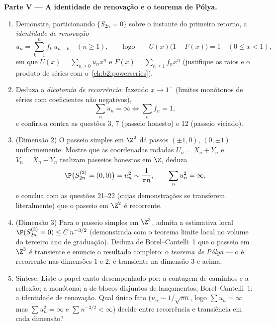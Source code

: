 \begin{problem}
\medskip
\noindent\textbf{Parte V --- A identidade de renovação e
o teorema de Pólya.}
\begin{enumerate}[resume]
  \item Demonstre, particionando $\{S_{2n} = 0\}$ sobre o instante
        do primeiro retorno, a \emph{identidade de renovação}
        \[
        u_n = \sum_{k=1}^n f_k\,u_{n-k} \quad (n \geq 1),
        \qquad\text{logo}\qquad
        U(x)\bigl(1 - F(x)\bigr) = 1 \quad (0 \leq x < 1),
        \]
        em que $U(x) = \sum_{n\geq0}u_nx^n$ e $F(x) =
        \sum_{n\geq1}f_nx^n$ (justifique os raios e o
        produto de séries com o~\cref{ch:b2:powerseries}).
  \item Deduza a \emph{dicotomia de recorrência}: fazendo $x
        \to 1^-$ (limites monótonos de séries com coeficientes
        não negativos),
        \[
        \sum_n u_n = \infty \iff \sum_n f_n = 1 ,
        \]
        e confira-a contra as questões 3, 7 (passeio honesto) e
        12 (passeio viciado).
  \item (Dimensão $2$) O passeio simples em $\Z^2$ dá passos
        $(\pm1, 0)$, $(0, \pm1)$ uniformemente. Mostre que as
        coordenadas rodadas $U_n = X_n + Y_n$ e $V_n = X_n
        - Y_n$ realizam passeios honestos \emph{} em
        $\Z$, deduza
        \[
        \P\bigl(S^{(2)}_{2n} = (0,0)\bigr) = u_n^2 \sim
        \frac1{\pi n},
        \qquad \sum_n u_n^2 = \infty ,
        \]
        e conclua com as questões 21--22 (cujas demonstrações
        se transferem literalmente) que o passeio em $\Z^2$ é
        recorrente.
  \item (Dimensão $3$) Para o passeio simples em $\Z^3$, admita
        a estimativa local $\P(S^{(3)}_{2n} = 0) \leq
        C\,n^{-3/2}$ (demonstrada com o teorema limite local no
        volume do terceiro ano de graduação). Deduza de Borel--Cantelli~1
        que o passeio em $\Z^3$ é transiente e enuncie o
        resultado completo: o \emph{teorema de Pólya} --- o  é recorrente nas dimensões $1$ e $2$,
        e transiente na dimensão $3$ e acima.
  \item Síntese. Liste o papel exato desempenhado por: a contagem
        de caminhos e a reflexão; a  monótona; a
         de blocos disjuntos de lançamentos;
        Borel--Cantelli~1; a identidade de renovação. Qual único
        fato  ($u_n \sim 1/\sqrt{\pi n}$, logo
        $\sum u_n = \infty$ mas $\sum u_n^2 = \infty$ e
        $\sum n^{-3/2} < \infty$) decide entre recorrência
        e transiência em cada dimensão?
\end{enumerate}
\end{problem}

